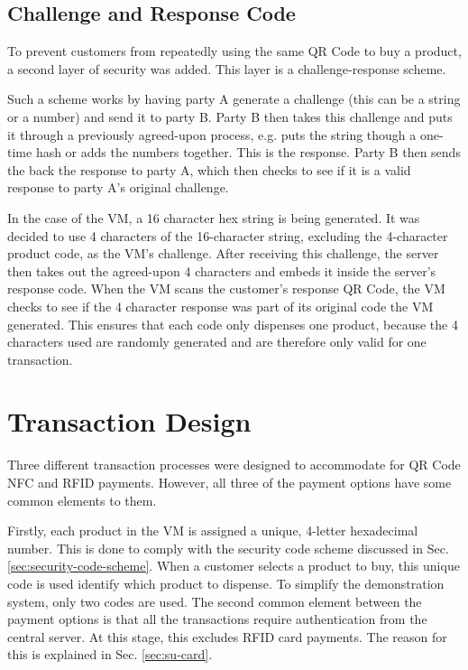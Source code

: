 \subsection{Challenge and Response Code}
\label{sec:challenge-response}

To prevent customers from repeatedly using the same QR Code to buy a
product, a second layer of security was added. This layer is a
challenge-response scheme. 

Such a scheme works by having party A generate a
challenge (this can be a string or a number) and send it to party B. Party B then takes
this challenge and puts it through a previously agreed-upon process, e.g. puts the string
though a one-time hash or adds the numbers together. This is the response.
Party B then sends the back the response to party A, which then checks to see
if it is a valid response to party A's original challenge.

In the case of the VM, a 16 character hex string is being generated. It was decided to use
4 characters of the 16-character string, excluding the 4-character product code, as the
VM's challenge. After receiving this challenge, the server then takes out the agreed-upon
4 characters and embeds it inside the server's response code. When the VM scans the
customer's response QR Code, the VM checks to see if the 4 character response was part of
its original code the VM generated. This ensures that each code only dispenses one
product, because the 4 characters used are randomly generated and are therefore only
valid for one transaction.
 
\section{Transaction Design}
\label{sec:transaction}

Three different transaction processes were designed to accommodate for QR Code NFC and
RFID payments. However, all three of the payment options have some common elements to
them.

Firstly, each product in the VM is assigned a unique, 4-letter hexadecimal number. This is
done to comply with the security code scheme discussed in Sec.
\ref{sec:security-code-scheme}. When a customer selects a product to buy, this unique
code is used identify which product to dispense. To simplify the demonstration system,
only two codes are used. The second common element between the payment
options is that all the transactions require authentication from the central server. At
this stage, this excludes RFID card payments. The reason for this is explained in Sec.
\ref{sec:su-card}.

